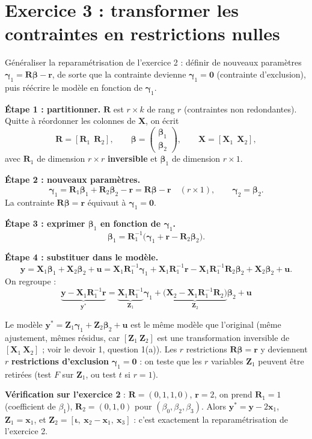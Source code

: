 \documentclass[11pt,a4paper]{article}
\newcommand{\vy}{\mathbf{y}}\newcommand{\vX}{\mathbf{X}}\newcommand{\vZ}{\mathbf{Z}}\newcommand{\vb}{\mathbf{b}}
\newcommand{\vx}{\mathbf{x}}\newcommand{\ve}{\mathbf{e}}\newcommand{\vu}{\mathbf{u}}\newcommand{\vr}{\mathbf{r}}\newcommand{\R}{\mathbf{R}}
\newcommand{\vbeta}{\bm{\beta}}\newcommand{\vgamma}{\bm{\gamma}}\newcommand{\veps}{\bm{\epsilon}}
\begin{document}
\section{Exercice 3 : transformer les contraintes en restrictions nulles}

\begin{idee}
Généraliser la reparamétrisation de l'exercice 2 : définir de nouveaux paramètres $\vgamma_1=\R\vbeta-\vr$, de sorte que la contrainte devienne $\vgamma_1=\mathbf 0$ (contrainte d'exclusion), puis réécrire le modèle en fonction de $\vgamma_1$.
\end{idee}

\textbf{Étape 1 : partitionner.} $\R$ est $r\times k$ de rang $r$ (contraintes non redondantes). Quitte à réordonner les colonnes de $\vX$, on écrit
\[
\R=[\R_1\ \ \R_2],\qquad \vbeta=\begin{pmatrix}\vbeta_1\\\vbeta_2\end{pmatrix},\qquad \vX=[\vX_1\ \ \vX_2],
\]
avec $\R_1$ de dimension $r\times r$ \textbf{inversible} et $\vbeta_1$ de dimension $r\times1$.

\textbf{Étape 2 : nouveaux paramètres.}
\[
\vgamma_1=\R_1\vbeta_1+\R_2\vbeta_2-\vr=\R\vbeta-\vr\quad(r\times1),\qquad \vgamma_2=\vbeta_2 .
\]
La contrainte $\R\vbeta=\vr$ équivaut à $\vgamma_1=\mathbf 0$.

\textbf{Étape 3 : exprimer $\vbeta_1$ en fonction de $\vgamma_1$.}
\[
\vbeta_1=\R_1^{-1}\big(\vgamma_1+\vr-\R_2\vbeta_2\big).
\]

\textbf{Étape 4 : substituer dans le modèle.}
\[
\vy=\vX_1\vbeta_1+\vX_2\vbeta_2+\vu=\vX_1\R_1^{-1}\vgamma_1+\vX_1\R_1^{-1}\vr-\vX_1\R_1^{-1}\R_2\vbeta_2+\vX_2\vbeta_2+\vu .
\]
On regroupe :
\[
\boxed{\ \underbrace{\vy-\vX_1\R_1^{-1}\vr}_{\vy^*}=\underbrace{\vX_1\R_1^{-1}}_{\vZ_1}\vgamma_1+\underbrace{\big(\vX_2-\vX_1\R_1^{-1}\R_2\big)}_{\vZ_2}\vbeta_2+\vu\ }
\]

\begin{reponse}
Le modèle $\vy^*=\vZ_1\vgamma_1+\vZ_2\vbeta_2+\vu$ est le même modèle que l'original (même ajustement, mêmes résidus, car $[\vZ_1\ \vZ_2]$ est une transformation inversible de $[\vX_1\ \vX_2]$ ; voir le devoir 1, question 1(a)). Les $r$ restrictions $\R\vbeta=\vr$ y deviennent $r$ \textbf{restrictions d'exclusion} $\vgamma_1=\mathbf 0$ : on teste que les $r$ variables $\vZ_1$ peuvent être retirées (test $F$ sur $\vZ_1$, ou test $t$ si $r=1$).

\textbf{Vérification sur l'exercice 2} : $\R=(0,1,1,0)$, $\vr=2$, on prend $\R_1=1$ (coefficient de $\beta_1$), $\R_2=(0,1,0)$ pour $(\beta_0,\beta_2,\beta_3)$. Alors $\vy^*=\vy-2\vx_1$, $\vZ_1=\vx_1$, et $\vZ_2=[\bm\iota,\ \vx_2-\vx_1,\ \vx_3]$ : c'est exactement la reparamétrisation de l'exercice 2.
\end{reponse}
\end{document}
